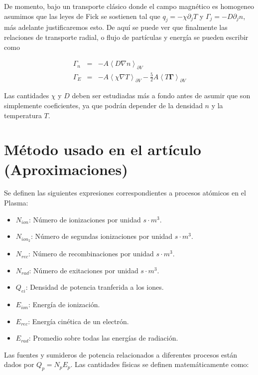 \documentclass[11pt]{article}
\theoremstyle{definition}
\begin{document}
  De momento, bajo un transporte cl\'asico donde el campo magn\'etico es homogeneo asumimos que las leyes de Fick se sostienen tal que $q_j = -\chi\partial_j T$ y $\Gamma_j = -D\partial_j n$, m\'as adelante justificaremos esto. De aqu\'i se puede ver que finalmente las relaciones de transporte radial, o flujo de part\'iculas y energ\'ia se pueden escribir como

  \begin{eqnarray}
    \Gamma_n &=& -A\left<D\nabla n\right>_{\partial V}\\
    \Gamma_E &=& -A\left<\chi\nabla T\right>_{\partial V} - \frac{5}{2}A\left<T\pmb{\Gamma}\right>_{\partial V}
    \end{eqnarray}
    
  Las cantidades $\chi$ y $D$ deben ser estudiadas m\'as a fondo antes de asumir que son simplemente coeficientes, ya que podr\'an depender de la densidad $n$ y la temperatura $T$.

  \section{M\'etodo usado en el art\'iculo (Aproximaciones)}

  Se definen las siguientes expresiones correspondientes a procesos at\'omicos en el Plasma:

  \begin{itemize}
    \item $N_{ion}$: N\'umero de ionizaciones por unidad $s\cdot m^3$.
    \item $N_{ion_2}$: N\'umero de segundas ionizaciones por unidad $s\cdot m^3$.
    \item $N_{rec}$: N\'umero de recombinaciones por unidad $s\cdot m^3$.
    \item $N_{rad}$: N\'umero de exitaciones por unidad $s\cdot m^3$.
    \item $Q_{ei}$: Densidad de potencia tranferida a los iones.
    \item $E_{ion}$: Energ\'ia de ionizaci\'on.
    \item $E_{rec}$: Energ\'ia cin\'etica de un electr\'on.
    \item $E_{rad}$: Promedio sobre todas las energ\'ias de radiaci\'on.
  \end{itemize}

  Las fuentes y sumideros de potencia relacionados a diferentes procesos est\'an dados por $Q_p = N_pE_p$. Las cantidades f\'isicas se definen matem\'aticamente como:
\end{document}
